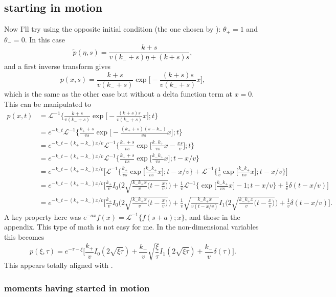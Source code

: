 \documentclass[11pt]{article}
\newcommand\be{\begin{equation}} %
\newcommand\ee{\end{equation}}   %
\newcommand\El{\mathcal{L}}
\begin{document}
\subsection{starting in motion}

Now I'll try using the opposite initial condition (the one chosen by \citet{Lisle1998}): $\theta_+ = 1$ and $\theta_- = 0$.
In this case
\be \tilde{p}(\eta,s) = \frac{k+s}{v(k_-+s)\eta + (k+s)s},\ee
and a first inverse transform gives
\be p(x,s) = \frac{k+s}{v(k_-+s)} \exp\Big[-\frac{(k+s)s}{v(k_-+s)}x\Big],\ee
which is the same as the other case but without a delta function term at $x=0$.
This can be manipulated to 
\begin{align} p(x,t) &= \El^{-1} \Big\{ \frac{k+s}{v(k_-+s)} \exp\Big[-\frac{(k+s)s}{v(k_-+s)}x\Big] ; t\Big\} \\
&=  e^{-k_- t}\El^{-1} \Big\{ \frac{k_++s}{vs} \exp\Big[-\frac{(k_++s)(s-k_-)}{vs}x\Big] ; t\Big\} \\
&= e^{-k_- t -(k_+-k_-)x/v}\El^{-1} \Big\{ \frac{k_++s}{vs} \exp\Big[\frac{k_-k_+}{vs}x - \frac{xs}{v}\Big] ; t\Big\}\\
&= e^{-k_- t -(k_+-k_-)x/v}\El^{-1} \Big\{ \frac{k_++s}{vs} \exp\Big[\frac{k_-k_+}{vs}x\Big] ; t-x/v\Big\} \\
&=  e^{-k_- t -(k_+-k_-)x/v} \Big[ \El^{-1}  \Big\{ \frac{k_+}{vs} \exp\Big[\frac{k_-k_+}{vs}x\Big];t-x/v \Big\} + \El^{-1}  \Big\{ \frac{1}{v} \exp\Big[\frac{k_-k_+}{vs}x\Big];t-x/v \Big\} \Big] \\
&=  e^{-k_- t -(k_+-k_-)x/v} \Big[\frac{k_+}{v} I_0\Big(2\sqrt{\frac{k_-k_+ x}{v}\big(t-\frac{x}{v}\big)}\Big) + \frac{1}{v}\El^{-1}\Big\{  \exp\Big[\frac{k_-k_+}{vs}x\Big] -1;t-x/v \Big\} + \frac{1}{v}\delta(t-x/v) \Big] \\ 
&=  e^{-k_- t -(k_+-k_-)x/v} \Big[\frac{k_+}{v} I_0\Big(2\sqrt{\frac{k_-k_+ x}{v}\big(t-\frac{x}{v}\big)}\Big) + \frac{1}{v}\sqrt{\frac{k_- k_+ x}{v (t-x/v)}}I_1\Big(2\sqrt{\frac{k_-k_+ x}{v}\big(t-\frac{x}{v}\big)}\Big) + \frac{1}{v}\delta(t-x/v) \Big].
\end{align}
A key property here was $e^{-ax}f(x) = \El^{-1}\{f(s+a);x\}$, and those in the appendix.
This type of math is not easy for me.
In the non-dimensional variables this becomes
\be p(\xi,\tau) = e^{-\tau-\xi}\Big[ \frac{k_+}{v} I_0(2\sqrt{\xi\tau}) + \frac{k_-}{v}\sqrt{\frac{\xi}{\tau}}I_1(2\sqrt{\xi\tau}) + \frac{k_-}{v} \delta(\tau)\Big].\ee
This appears totally aligned with \citet{Lisle1998}.
\subsubsection{moments having started in motion}
\end{document}

